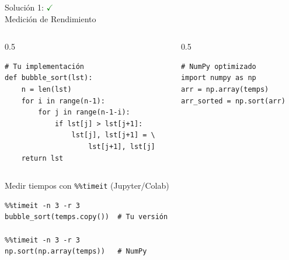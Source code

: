 \documentclass[10pt]{beamer}
\begin{document}
\begin{solutionblock}
\begin{frame}[fragile]{Solución 1: \hfill \textcolor{green}{$\checkmark$} \\ Medición de Rendimiento}
\begin{columns}
\begin{column}{0.5\textwidth}
\begin{verbatim}
# Tu implementación
def bubble_sort(lst):
    n = len(lst)
    for i in range(n-1):
        for j in range(n-1-i):
            if lst[j] > lst[j+1]:
                lst[j], lst[j+1] = \
                    lst[j+1], lst[j]
    return lst
\end{verbatim}
\end{column}
\begin{column}{0.5\textwidth}
\begin{verbatim}
# NumPy optimizado
import numpy as np
arr = np.array(temps)
arr_sorted = np.sort(arr)
\end{verbatim}
\end{column}
\end{columns}

\vspace{0.3cm}
\begin{block}{Medir tiempos con \texttt{\%\%timeit} (Jupyter/Colab)}
\begin{verbatim}
%%timeit -n 3 -r 3
bubble_sort(temps.copy())  # Tu versión

%%timeit -n 3 -r 3
np.sort(np.array(temps))   # NumPy
\end{verbatim}
\end{block}
\end{frame}
\end{solutionblock}
\end{document}
